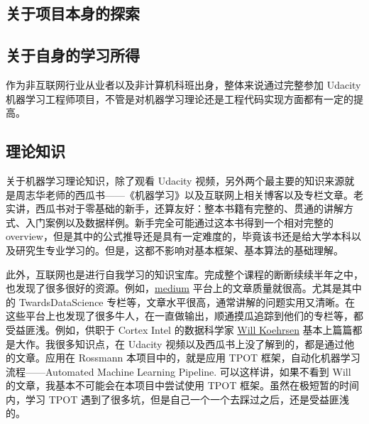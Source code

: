 \documentclass[a4paper]{article}
\begin{document}
\subsection{关于项目本身的探索}

\subsection{关于自身的学习所得}
作为非互联网行业从业者以及非计算机科班出身，整体来说通过完整参加 Udacity 机器学习工程师项目，不管是对机器学习理论还是工程代码实现方面都有一定的提高。
\subsection{理论知识}
关于机器学习理论知识，除了观看 Udacity 视频，另外两个最主要的知识来源就是周志华老师的西瓜书——《机器学习》以及互联网上相关博客以及专栏文章。老实讲，西瓜书对于零基础的新手，还算友好：整本书籍有完整的、贯通的讲解方式、入门案例以及数据样例。新手完全可能通过这本书得到一个相对完整的 overview，但是其中的公式推导还是具有一定难度的，毕竟该书还是给大学本科以及研究生专业学习的。但是，这都不影响对基本框架、基本算法的基础理解。

此外，互联网也是进行自我学习的知识宝库。完成整个课程的断断续续半年之中，也发现了很多很好的资源。例如，\href{https://medium.com/}{medium} 平台上的文章质量就很高。尤其是其中的 TwardsDataScience 专栏等，文章水平很高，通常讲解的问题实用又清晰。在这些平台上也发现了很多牛人，在一直做输出，顺通摸瓜追踪到他们的专栏等，都受益匪浅。例如，供职于 Cortex Intel 的数据科学家 \href{https://medium.com/@williamkoehrsen}{Will Koehrsen} 基本上篇篇都是大作。我很多知识点，在 Udacity 视频以及西瓜书上没了解到的，都是通过他的文章。应用在 Rossmann 本项目中的，就是应用 TPOT 框架，自动化机器学习流程——Automated Machine Learning Pipeline. 可以这样讲，如果不看到 Will 的文章，我基本不可能会在本项目中尝试使用 TPOT 框架。虽然在极短暂的时间内，学习 TPOT 遇到了很多坑，但是自己一个一个去踩过之后，还是受益匪浅的。
\end{document}
